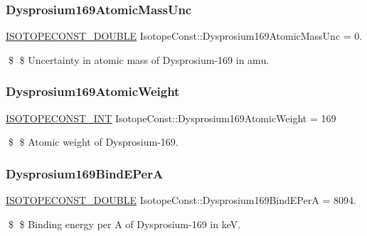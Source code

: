 \subsubsection{\texorpdfstring{Dysprosium169\+Atomic\+Mass\+Unc}{Dysprosium169AtomicMassUnc}}
{\footnotesize\ttfamily \mbox{\hyperlink{group___isotope_const-_macros_ga8f45a7272ce02c0b4c65c44636ed719a}{I\+S\+O\+T\+O\+P\+E\+C\+O\+N\+S\+T\+\_\+\+D\+O\+U\+B\+LE}} Isotope\+Const\+::\+Dysprosium169\+Atomic\+Mass\+Unc = 0.}

\$ \$ Uncertainty in atomic mass of Dysprosium-\/169 in amu. \mbox{\label{group___isotope_const-_dysprosium-_dy169_gaa04accb497e8664846e55590d9aad27e}} 
\subsubsection{\texorpdfstring{Dysprosium169\+Atomic\+Weight}{Dysprosium169AtomicWeight}}
{\footnotesize\ttfamily \mbox{\hyperlink{group___isotope_const-_macros_ga5f18360b3e99483a35c32d789e62621c}{I\+S\+O\+T\+O\+P\+E\+C\+O\+N\+S\+T\+\_\+\+I\+NT}} Isotope\+Const\+::\+Dysprosium169\+Atomic\+Weight = 169}

\$ \$ Atomic weight of Dysprosium-\/169. \mbox{\label{group___isotope_const-_dysprosium-_dy169_gaa58b06f6c579939ea8e97967e1cba169}} 
\subsubsection{\texorpdfstring{Dysprosium169\+Bind\+E\+PerA}{Dysprosium169BindEPerA}}
{\footnotesize\ttfamily \mbox{\hyperlink{group___isotope_const-_macros_ga8f45a7272ce02c0b4c65c44636ed719a}{I\+S\+O\+T\+O\+P\+E\+C\+O\+N\+S\+T\+\_\+\+D\+O\+U\+B\+LE}} Isotope\+Const\+::\+Dysprosium169\+Bind\+E\+PerA = 8094.}

\$ \$ Binding energy per A of Dysprosium-\/169 in keV. \mbox{\label{group___isotope_const-_dysprosium-_dy169_gad651f2b7f1702f4fc7b065325125ebab}} 
